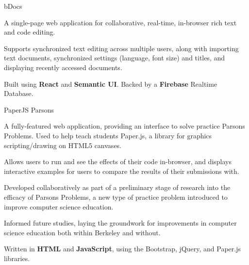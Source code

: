 

\begin{cventries}

  \cventry
    {} %
    {bDocs} %
    {} %
    {} %
    {
      \vspace{-9mm}
      \begin{cvprojectitems}
        \item A single-page web application for collaborative, real-time, in-browser rich text and code editing.
        \item Supports synchronized text editing across multiple users, along with importing text documents, synchronized settings (language, font size) and titles, and displaying recently accessed documents.
        \item Built using \textbf{React} and \textbf{Semantic UI}. Backed by a \textbf{Firebase} Realtime Database. 
      \end{cvprojectitems}
    }

  \vspace{-3mm}
  \cventry
    {} %
    {PaperJS Parsons} %
    {} %
    {} %
    {
      \begin{cvprojectitems}
        \vspace{-9mm}
        \item A fully-featured web application, providing an interface to solve practice Parsons Problems. Used to help teach students Paper.js, a library for graphics scripting/drawing on HTML5 canvases.
        \item Allows users to run and see the effects of their code in-browser, and displays interactive examples for users to compare the results of their submissions with.
        \item Developed collaboratively as part of a preliminary stage of research into the efficacy of Parsons Problems, a new type of practice problem introduced to improve computer science education.
        \item Informed future studies, laying the groundwork for improvements in computer science education both within Berkeley and without.
        \item Written in \textbf{HTML} and \textbf{JavaScript}, using the Bootstrap, jQuery, and Paper.js libraries.
      \end{cvprojectitems}
    }
\end{cventries}
